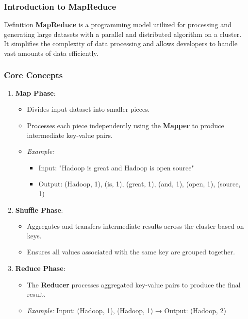 \documentclass[aspectratio=169]{beamer}
\begin{document}
\begin{frame}
    \titlepage
\end{frame}

\begin{frame}
    \frametitle{Introduction to MapReduce}
    \begin{block}{Definition}
        \textbf{MapReduce} is a programming model utilized for processing and generating large datasets with a parallel and distributed algorithm on a cluster. It simplifies the complexity of data processing and allows developers to handle vast amounts of data efficiently.
    \end{block}
\end{frame}

\begin{frame}
    \frametitle{Core Concepts}
    \begin{enumerate}
        \item \textbf{Map Phase}:
        \begin{itemize}
            \item Divides input dataset into smaller pieces.
            \item Processes each piece independently using the \textbf{Mapper} to produce intermediate key-value pairs.
            \item \textit{Example:}
            \begin{itemize}
                \item Input: "Hadoop is great and Hadoop is open source"
                \item Output: (Hadoop, 1), (is, 1), (great, 1), (and, 1), (open, 1), (source, 1)
            \end{itemize}
        \end{itemize}

        \item \textbf{Shuffle Phase}:
        \begin{itemize}
            \item Aggregates and transfers intermediate results across the cluster based on keys.
            \item Ensures all values associated with the same key are grouped together.
        \end{itemize}

        \item \textbf{Reduce Phase}:
        \begin{itemize}
            \item The \textbf{Reducer} processes aggregated key-value pairs to produce the final result.
            \item \textit{Example:} Input: (Hadoop, 1), (Hadoop, 1) → Output: (Hadoop, 2)
        \end{itemize}
    \end{enumerate}
\end{frame}
\end{document}
